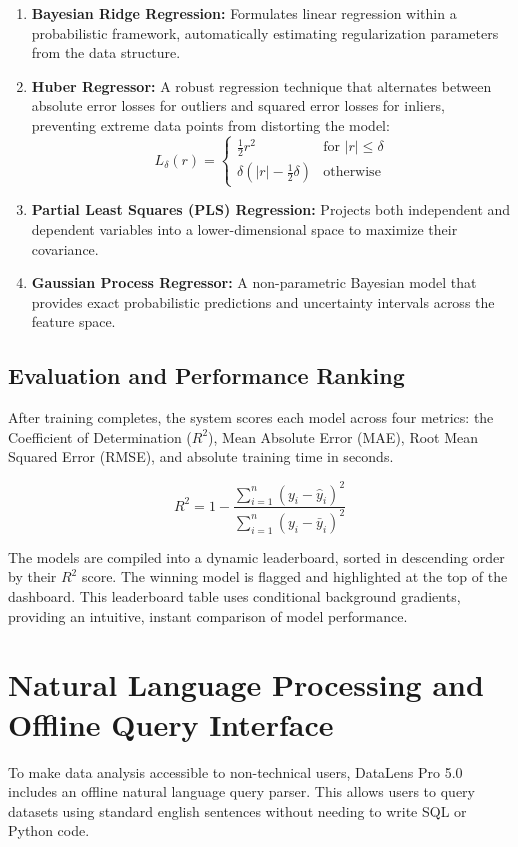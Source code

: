 \documentclass[11pt,a4paper,titlepage]{article}
\begin{document}
\begin{enumerate}
    \item \textbf{Bayesian Ridge Regression:} Formulates linear regression within a probabilistic framework, automatically estimating regularization parameters from the data structure.
    \item \textbf{Huber Regressor:} A robust regression technique that alternates between absolute error losses for outliers and squared error losses for inliers, preventing extreme data points from distorting the model:
    $$L_{\delta}(r) = \begin{cases} \frac{1}{2}r^2 & \text{for } |r| \le \delta \\ \delta(|r| - \frac{1}{2}\delta) & \text{otherwise} \end{cases}$$
    \item \textbf{Partial Least Squares (PLS) Regression:} Projects both independent and dependent variables into a lower-dimensional space to maximize their covariance.
    \item \textbf{Gaussian Process Regressor:} A non-parametric Bayesian model that provides exact probabilistic predictions and uncertainty intervals across the feature space.
\end{enumerate}

\subsection{Evaluation and Performance Ranking}
After training completes, the system scores each model across four metrics: the Coefficient of Determination ($R^2$), Mean Absolute Error (MAE), Root Mean Squared Error (RMSE), and absolute training time in seconds. 

$$R^2 = 1 - \frac{\sum_{i=1}^{n} (y_i - \hat{y}_i)^2}{\sum_{i=1}^{n} (y_i - \bar{y}_i)^2}$$

The models are compiled into a dynamic leaderboard, sorted in descending order by their $R^2$ score. The winning model is flagged and highlighted at the top of the dashboard. This leaderboard table uses conditional background gradients, providing an intuitive, instant comparison of model performance.


\section{Natural Language Processing and Offline Query Interface}
To make data analysis accessible to non-technical users, DataLens Pro 5.0 includes an offline natural language query parser. This allows users to query datasets using standard english sentences without needing to write SQL or Python code.
\end{document}
